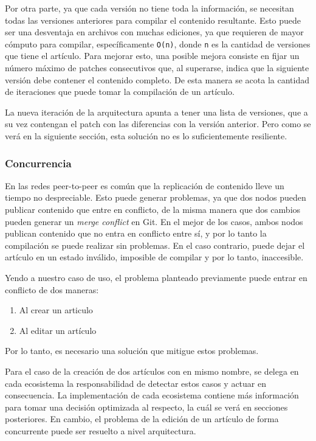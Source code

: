 Por otra parte, ya que cada versión no tiene toda la información, se necesitan todas las versiones anteriores para compilar el contenido resultante. Esto puede ser una desventaja en archivos con muchas ediciones, ya que requieren de mayor cómputo para compilar, específicamente \texttt{O(n)}, donde \texttt{n} es la cantidad de versiones que tiene el artículo. Para mejorar esto, una posible mejora consiste en fijar un número máximo de patches consecutivos que, al superarse, indica que la siguiente versión debe contener el contenido completo. De esta manera se acota la cantidad de iteraciones que puede tomar la compilación de un artículo.

La nueva iteración de la arquitectura apunta a tener una lista de versiones, que a su vez contengan el patch con las diferencias con la versión anterior. Pero como se verá en la siguiente sección, esta solución no es lo suficientemente resiliente.

\subsubsection{Concurrencia}

En las redes peer-to-peer es común que la replicación de contenido lleve un tiempo no despreciable. Esto puede generar problemas, ya que dos nodos pueden publicar contenido que entre en conflicto, de la misma manera que dos cambios pueden generar un \textit{merge conflict} en Git. En el mejor de los casos, ambos nodos publican
contenido que no entra en conflicto entre sí, y por lo tanto la compilación se puede realizar sin problemas. En el caso contrario, puede dejar el artículo en un estado inválido, imposible de compilar y por lo tanto, inaccesible.

Yendo a nuestro caso de uso, el problema planteado previamente puede entrar en conflicto de dos maneras:
\begin{enumerate}
    \item Al crear un articulo
    \item Al editar un artículo
\end{enumerate}

Por lo tanto, es necesario una solución que mitigue estos problemas.

Para el caso de la creación de dos artículos con en mismo nombre, se delega en cada ecosistema la responsabilidad de detectar estos casos y actuar en consecuencia. La implementación de cada ecosistema contiene más información para tomar una decisión optimizada al respecto, la cuál se verá en secciones posteriores. En cambio, el problema de la edición de un artículo de forma concurrente puede ser resuelto a nivel arquitectura.

